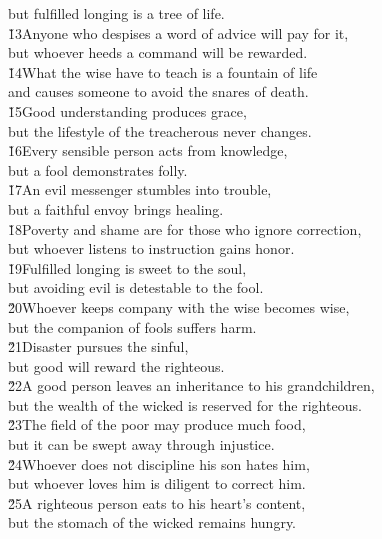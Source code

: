 \begin{poetry}
\poemll    but fulfilled longing is a tree of life. \\
\poeml \v{13}Anyone who despises a word of advice will pay for it, \\
\poemll    but whoever heeds a command will be rewarded. \\
\poeml \v{14}What the wise have to teach is a fountain of life \\
\poemll    and causes someone to avoid the snares of death. \\
\poeml \v{15}Good understanding produces grace, \\
\poemll    but the lifestyle of the treacherous never changes. \\
\poeml \v{16}Every sensible person acts from knowledge, \\
\poemll    but a fool demonstrates folly. \\
\poeml \v{17}An evil messenger stumbles into trouble, \\
\poemll    but a faithful envoy brings healing. \\
\poeml \v{18}Poverty and shame are for those who ignore correction, \\
\poemll    but whoever listens to instruction gains honor. \\
\poeml \v{19}Fulfilled longing is sweet to the soul, \\
\poemll    but avoiding evil is detestable to the fool. \\
\poeml \v{20}Whoever keeps company with the wise becomes wise, \\
\poemll    but the companion of fools suffers harm. \\
\poeml \v{21}Disaster pursues the sinful, \\
\poemll    but good will reward the righteous. \\
\poeml \v{22}A good person leaves an inheritance to his grandchildren, \\
\poemll    but the wealth of the wicked is reserved for the righteous. \\
\poeml \v{23}The field of the poor may produce much food, \\
\poemll    but it can be swept away through injustice. \\
\poeml \v{24}Whoever does not discipline his son hates him, \\
\poemll    but whoever loves him is diligent to correct him. \\
\poeml \v{25}A righteous person eats to his heart's content, \\
\poemll    but the stomach of the wicked remains hungry.
\end{poetry}

